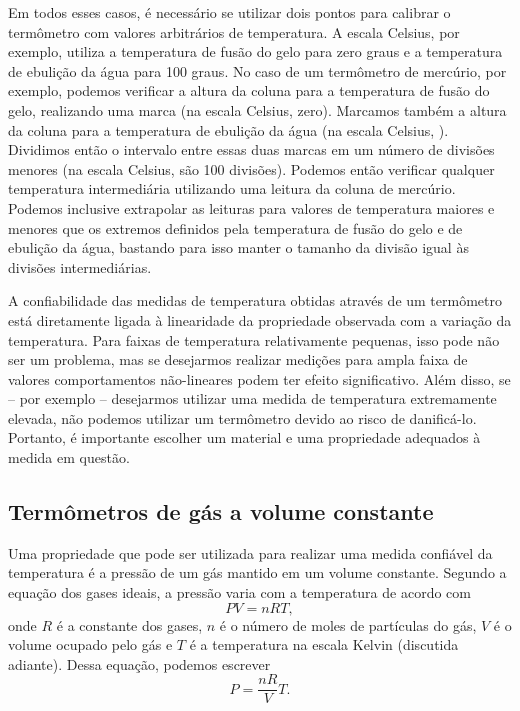Em todos esses casos, é necessário se utilizar dois pontos para calibrar o termômetro com valores arbitrários de temperatura. A escala Celsius, por exemplo, utiliza a temperatura de fusão do gelo para zero graus e a temperatura de ebulição da água para 100 graus. No caso de um termômetro de mercúrio, por exemplo, podemos verificar a altura da coluna para a temperatura de fusão do gelo, realizando uma marca (na escala Celsius, zero). Marcamos também a altura da coluna para a temperatura de ebulição da água (na escala Celsius, ). Dividimos então o intervalo entre essas duas marcas em um número de divisões menores (na escala Celsius, são 100 divisões). Podemos então verificar qualquer temperatura intermediária utilizando uma leitura da coluna de mercúrio. Podemos inclusive extrapolar as leituras para valores de temperatura maiores e menores que os extremos definidos pela temperatura de fusão do gelo e de ebulição da água, bastando para isso manter o tamanho da divisão igual às divisões intermediárias.

A confiabilidade das medidas de temperatura obtidas através de um termômetro está diretamente ligada à linearidade da propriedade observada com a variação da temperatura. Para faixas de temperatura relativamente pequenas, isso pode não ser um problema, mas se desejarmos realizar medições para ampla faixa de valores comportamentos não-lineares podem ter efeito significativo. Além disso, se -- por exemplo -- desejarmos utilizar uma medida de temperatura extremamente elevada, não podemos utilizar um termômetro devido ao risco de danificá-lo. Portanto, é importante escolher um material e uma propriedade adequados à medida em questão.

\subsection{Termômetros de gás a volume constante}

Uma propriedade que pode ser utilizada para realizar uma medida confiável da temperatura é a pressão de um gás mantido em um volume constante. Segundo a equação dos gases ideais, a pressão varia com a temperatura de acordo com
\begin{equation}
	PV = nRT,
\end{equation}
%
onde $R$ é a constante dos gases, $n$ é o número de moles de partículas do gás, $V$ é o volume ocupado pelo gás e $T$ é a temperatura na escala Kelvin (discutida adiante). Dessa equação, podemos escrever
\begin{equation}\label{Eq:PvsT}
	P = \frac{nR}{V} T.
\end{equation}

